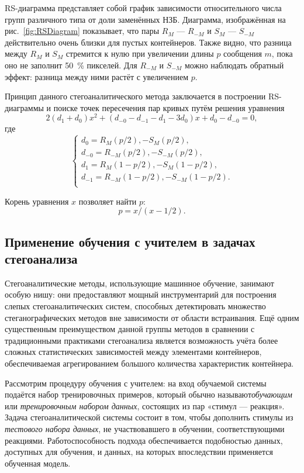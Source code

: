 RS-диаграмма представляет собой график зависимости относительного числа групп различного типа от доли заменённых НЗБ. Диаграмма, изображённая на рис.~\ref{fig:RSDiagram} показывает, что пары $ R_M $ --- $ R_{-M} $ и $ S_M $ --- $ S_{-M} $ действительно очень близки для пустых контейнеров. Также видно, что разница между $ R_M $  и $ S_M $ стремится к нулю при увеличении длины $ p $ сообщения $ m $, пока оно не заполнит 50~\% пикселей. Для $ R_{-M} $ и $ S_{-M} $ можно наблюдать обратный эффект: разница между ними растёт с увеличением $ p $.

Принцип данного стегоаналитического метода заключается в построении RS-диаграммы и поиске точек пересечения пар кривых путём решения уравнения
\begin{equation*}
2(d_1 + d_0)x^2 + (d_{-0} - d_{-1} - d_1 - 3{d_0})x + d_0 - d_{-0} = 0,
\end{equation*}
где
\begin{equation*}
\begin{cases}
d_0 = R_M(p/2), - S_M(p/2), \\
d_{-0} = R_{-M}(p/2), - S_{-M}(p/2), \\
d_1 = R_M(1 - p/2), - S_M(1 - p/2), \\
d_{-1} = R_{-M}(1 - p/2), - S_{-M}(1 - p/2). \\
\end{cases}
\end{equation*}

Корень уравнения $ x $ позволяет найти $ p $:
\begin{equation*}
p = x/(x - 1/2).
\end{equation*}

\subsection{Применение обучения с учителем в задачах стегоанализа}

Стегоаналитические методы, использующие машинное обучение, занимают особую нишу: они предоставляют мощный инструментарий для построения слепых стегоаналитических систем, способных детектировать множество стеганографических методов вне зависимости от области встраивания. Ещё одним существенным преимуществом данной группы методов в сравнении с традиционными практиками стегоанализа является возможность учёта более сложных статистических зависимостей между элементами контейнеров, обеспечиваемая агрегированием большого количества характеристик контейнера.

Рассмотрим процедуру обучения с учителем: на вход обучаемой системы подаётся набор тренировочных примеров, который обычно называют\textit{обучающим} или \textit{тренировочным набором данных}, состоящих из пар «стимул --- реакция». Задача стегоаналитической системы состоит в том, чтобы дополнить стимулы из \textit{тестового набора данных}, не участвовавшего в обучении, соответствующими реакциями. Работоспособность подхода обеспечивается подобностью данных, доступных для обучения, и данных, на которых впоследствии применяется обученная модель.

